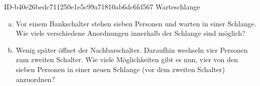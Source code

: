 \begin{exercise}
      {ID-b40e26bedc711250e1e5c99a71810ab6dc6fd567}
      {Warteschlange}
  \ifproblem\problem\par
    \begin{enumerate}[a)]
      \item Vor einem Bankschalter stehen sieben Personen und warten in einer
            Schlange. Wie viele verschiedene Anordnungen innerhalb der Schlange
            sind möglich?
      \item Wenig später öffnet der Nachbarschalter. Daraufhin wechseln vier
            Personen zum zweiten Schalter. Wie viele Möglichkeiten gibt es nun,
            vier von den sieben Personen in einer neuen Schlange (vor dem zweiten
            Schalter) anzuordnen?
    \end{enumerate}
  \fi
\end{exercise}
